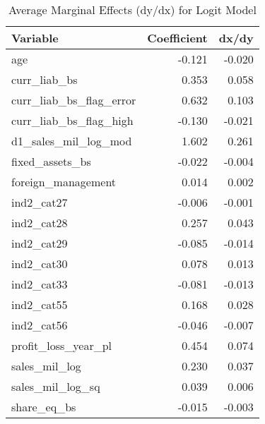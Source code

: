 \begin{table}

\caption{\label{tab:}Average Marginal Effects (dy/dx) for Logit Model}
\centering
\begin{tabular}[t]{l|r|r}
\hline
Variable & Coefficient & dx/dy\\
\hline
age & -0.121 & -0.020\\
\hline
curr\_liab\_bs & 0.353 & 0.058\\
\hline
curr\_liab\_bs\_flag\_error & 0.632 & 0.103\\
\hline
curr\_liab\_bs\_flag\_high & -0.130 & -0.021\\
\hline
d1\_sales\_mil\_log\_mod & 1.602 & 0.261\\
\hline
fixed\_assets\_bs & -0.022 & -0.004\\
\hline
foreign\_management & 0.014 & 0.002\\
\hline
ind2\_cat27 & -0.006 & -0.001\\
\hline
ind2\_cat28 & 0.257 & 0.043\\
\hline
ind2\_cat29 & -0.085 & -0.014\\
\hline
ind2\_cat30 & 0.078 & 0.013\\
\hline
ind2\_cat33 & -0.081 & -0.013\\
\hline
ind2\_cat55 & 0.168 & 0.028\\
\hline
ind2\_cat56 & -0.046 & -0.007\\
\hline
profit\_loss\_year\_pl & 0.454 & 0.074\\
\hline
sales\_mil\_log & 0.230 & 0.037\\
\hline
sales\_mil\_log\_sq & 0.039 & 0.006\\
\hline
share\_eq\_bs & -0.015 & -0.003\\
\hline
\end{tabular}
\end{table}